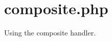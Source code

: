 \hypertarget{composite_8php-example}{
\section{composite.php}
}
Using the composite handler.


\begin{DoxyCodeInclude}
\end{DoxyCodeInclude}
 